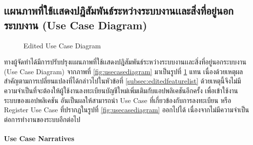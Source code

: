 \documentclass[14pt,oneside,openright,a4paper]{cpe-thai-project}
\begin{document}
 \subsection{เเผนภาพที่ใช้เเสดงปฎิสัมพันธ์ระหว่างระบบงานเเละสิ่งที่อยู่นอกระบบงาน (Use Case Diagram)}
   \begin{figure}[H]\centering
    \setlength{\fboxrule}{0.5mm} %
    \setlength{\fboxsep}{0.5cm}
    \caption{Edited Use Case Diagram}\label{fig:editedusecasediagram}
   \end{figure}
  ทางผู้จัดทำได้มีการปรับปรุงเเผนภาพที่ใช้เเสดงปฎิสัมพันธ์ระหว่างระบบงานเเละสิ่งที่อยู่นอกระบบงาน (Use Case Diagram) จากภาพที่ \ref{fig:usecasediagram} มาเป็นรูปที่ \ref{fig:editedusecasediagram} แทน 
  เนื่องด้วยเหตุผลสำคัญตามการเปลี่ยนแปลงที่ได้กล่าวไปในหัวข้อที่ \ref{subsec:editedfeaturelist} ด้วยเหตุนี้จึงไม่มีความจำเป็นที่จะต้องให้ผู้ใช้งานลงทะเบียนบัญชีใหม่เพิ่มเติมกับแอปพลิเคชันอีกครั้ง 
  เพื่อเข้าใช้งานระบบของแอปพลิเคชัน อันเป็นผลให้สามารถนำ Use Case ที่เกี่ยวข้องกับการลงทะเบียน หรือ Register Use Case ที่ปรากฏในรูปที่ \ref{fig:usecasediagram} ออกไปได้ เนื่องจากไม่มีความจำเป็นต่อการทำงานของระบบอีกต่อไป
  \\ \\
  \textbf{Use Case Narratives}
\end{document}
